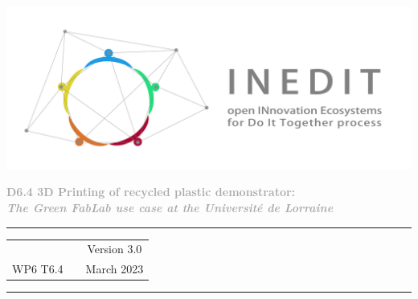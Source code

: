 
\begin{titlepage}
	\begin{center}

		\vspace{30mm}
		
		\includegraphics[width=\linewidth]{figures/Inedit_horiz.pdf}\\ 
		
		\vfill
		
		\textbf{\Huge{\textcolor{darkgray}{ D6.4 3D Printing of recycled plastic demonstrator: }}} \\[5pt] 
		
		\textbf{\LARGE{\textcolor{darkgray}{\emph{The Green FabLab use case at the Université de Lorraine}}}} \\ 
		 
		 
		\vfill
		
		\vspace{60mm} 
		
		
		
      \textcolor{gray}{\rule{\textwidth}{2pt}}
      
		\vspace{5pt}
		\begin{tabular}{ c p{8cm} c }
           & & Version 3.0  \\ 
         WP6 T6.4  & & March 2023   \\ 
      \end{tabular}
		\vspace{5pt} 
		
		\textcolor{gray}{\rule{\textwidth}{2pt}}
		
		
	
		
		\vfill
		
	\end{center}
\end{titlepage}

\newpage



